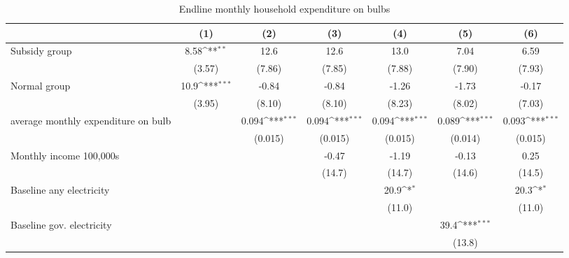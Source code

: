 \begin{table}[htbp]\centering
\def\sym#1{\ifmmode^{#1}\else\(^{#1}\)\fi}
\caption{Endline monthly household expenditure on bulbs}
\begin{tabular*}{1\hsize}{@{\hskip\tabcolsep\extracolsep\fill}l*{6}{c}}
\toprule
                &\multicolumn{1}{c}{(1)}         &\multicolumn{1}{c}{(2)}         &\multicolumn{1}{c}{(3)}         &\multicolumn{1}{c}{(4)}         &\multicolumn{1}{c}{(5)}         &\multicolumn{1}{c}{(6)}         \\
\midrule
Subsidy group   &     8.58\sym{**} &     12.6         &     12.6         &     13.0         &     7.04         &     6.59         \\
                &   (3.57)         &   (7.86)         &   (7.85)         &   (7.88)         &   (7.90)         &   (7.93)         \\
Normal group    &     10.9\sym{***}&    -0.84         &    -0.84         &    -1.26         &    -1.73         &    -0.17         \\
                &   (3.95)         &   (8.10)         &   (8.10)         &   (8.23)         &   (8.02)         &   (7.03)         \\
average monthly expenditure on bulb&                  &    0.094\sym{***}&    0.094\sym{***}&    0.094\sym{***}&    0.089\sym{***}&    0.093\sym{***}\\
                &                  &  (0.015)         &  (0.015)         &  (0.015)         &  (0.014)         &  (0.015)         \\
Monthly income 100,000s&                  &                  &    -0.47         &    -1.19         &    -0.13         &     0.25         \\
                &                  &                  &   (14.7)         &   (14.7)         &   (14.6)         &   (14.5)         \\
Baseline any electricity&                  &                  &                  &     20.9\sym{*}  &                  &     20.3\sym{*}  \\
                &                  &                  &                  &   (11.0)         &                  &   (11.0)         \\
Baseline gov. electricity&                  &                  &                  &                  &     39.4\sym{***}&                  \\
                &                  &                  &                  &                  &   (13.8)         &                  \\

\end{tabular*}
\end{table}
